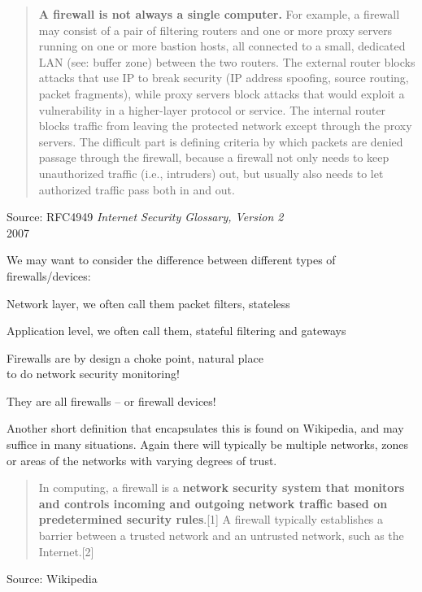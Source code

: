 \documentclass[Screen16to9,17pt]{foils}
\begin{document}
\begin{quote}\small
{\bf A firewall is not always a single computer.} For example, a firewall may consist of a pair of filtering routers and one or more proxy servers running on one or more bastion hosts, all connected to a small, dedicated LAN (see: buffer zone) between the two routers. The external router blocks attacks that use IP to break security (IP address spoofing, source routing, packet fragments), while proxy servers block attacks that would exploit a vulnerability in a higher-layer protocol or service. The internal router blocks traffic from leaving the protected network except through the proxy servers. The difficult part is defining criteria by which packets are denied passage through the firewall, because a firewall not only needs to keep unauthorized traffic (i.e., intruders) out, but usually also needs to let authorized traffic pass both in and out.
\end{quote}
{\footnotesize Source: RFC4949 \emph{Internet Security Glossary, Version 2}\\
 2007}


We may want to consider the difference between different types of firewalls/devices:
\begin{list2}
\item Network layer, we often call them packet filters, stateless
\item Application level, we often call them, stateful filtering and gateways
\item Firewalls are by design a choke point, natural place \\
to do network security monitoring!
\end{list2}

They are all firewalls -- or firewall devices!


Another short definition that encapsulates this is found on Wikipedia, and may suffice in many situations. Again there will typically be multiple networks, zones or areas of the networks with varying degrees of trust.
\begin{quote}
In computing, a firewall is a {\bf network security system that monitors and controls incoming and outgoing network traffic based on predetermined security rules}.[1] A firewall typically establishes a barrier between a trusted network and an untrusted network, such as the Internet.[2]
\end{quote}
Source: Wikipedia
\end{document}
